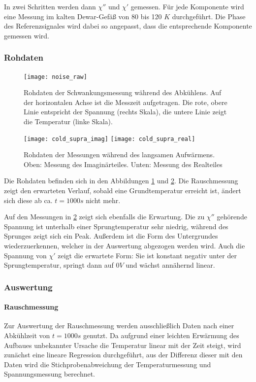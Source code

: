 \documentclass{../Misc/MontavonLaTeX/Montavon}
\begin{document}
In zwei Schritten werden dann $\chi''$ und $\chi'$ gemessen. Für jede Komponente wird eine Messung im kalten Dewar-Gefäß von 80 bis 120 $\unit{K}$ durchgeführt. Die Phase des Referenzsignales wird dabei so angepasst, dass die entsprechende Komponente gemessen wird.

\subsubsection{Rohdaten}
\begin{figure}[htbp]
\centering
\texttt{[image: noise\_raw]}
\caption{Rohdaten der Schwankungsmessung während des Abkühlens. Auf der horizontalen Achse ist die Messzeit aufgetragen. Die rote, obere Linie entspricht der Spannung (rechts Skala), die untere Linie zeigt die Temperatur (linke Skala).}
\label{fig:noise_raw}
\end{figure}

\begin{figure}[htbp]
\centering
\texttt{[image: cold\_supra\_imag]}
\texttt{[image: cold\_supra\_real]}
\caption{Rohdaten der Messungen während des langsamen Aufwärmens. Oben: Messung des Imaginärteiles. Unten: Messung des Realteiles}
\label{fig:cold_supra_raw}
\end{figure}

Die Rohdaten befinden sich in den Abbildungen \ref{fig:noise_raw} und \ref{fig:cold_supra_raw}. Die Rauschmessung zeigt den erwarteten Verlauf, sobald eine Grundtemperatur erreicht ist, ändert sich diese ab ca. $t = 1000 \unit{s}$ nicht mehr.

Auf den Messungen in \ref{fig:cold_supra_raw} zeigt sich ebenfalls die Erwartung. Die zu $\chi''$ gehörende Spannung ist unterhalb einer Sprungtemperatur sehr niedrig, während des Sprunges zeigt sich ein Peak. Außerdem ist die Form des Untergrundes wiederzuerkennen, welcher in der Auswertung abgezogen werden wird. Auch die Spannung von $\chi'$ zeigt die erwartete Form: Sie ist konstant negativ unter der Sprungtemperatur, springt dann auf $0 \unit{V}$ und wächst annähernd linear.

\subsubsection{Auswertung}
\paragraph{Rauschmessung}
Zur Auswertung der Rauschmessung werden ausschließlich Daten nach einer Abkühlzeit von $t = 1000 \unit{s}$ genutzt. Da aufgrund einer leichten Erwärmung des Aufbaues unbekannter Ursache die Temperatur linear mit der Zeit steigt, wird zunächst eine lineare Regression durchgeführt, aus der Differenz dieser mit den Daten wird die Stichprobenabweichung der Temperaturmessung und Spannungsmessung berechnet.
\end{document}
